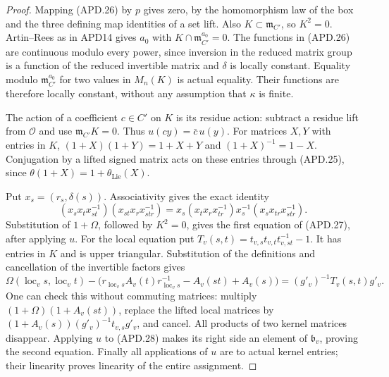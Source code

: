 \documentclass[11pt,a4paper]{article}
\numberwithin{equation}{section}
\theoremstyle{remark}\newtheorem{remark}[theorem]{Remark}
\begin{document}
\begin{proof}
Mapping (APD.26) by \(p\) gives zero, by the homomorphism law
of the box and the three defining map identities of a set lift.
Also \(K\subset\mathfrak m_{C'}\), so \(K^2=0\).
Artin--Rees as in APD14 gives \(a_0\) with
\(K\cap\mathfrak m_{C'}^{a_0}=0\).  The functions in (APD.26)
are continuous modulo every power, since inversion in the reduced
matrix group is a function of the reduced invertible matrix and
\(\delta\) is locally constant.  Equality modulo
\(\mathfrak m_{C'}^{a_0}\) for two values in \(M_n(K)\)
is actual equality.  Their functions are therefore locally
constant, without any assumption that \(\kappa\) is finite.

The action of a coefficient \(c\in C'\) on \(K\) is its
residue action: subtract a residue lift from \(\mathcal O\)
and use \(\mathfrak m_{C'}K=0\).  Thus \(u(cy)=\bar c\,u(y)\).
For matrices \(X,Y\) with entries in \(K\),
\((1+X)(1+Y)=1+X+Y\) and \((1+X)^{-1}=1-X\).
Conjugation by a lifted signed matrix acts on these entries
through (APD.25), since
\(\theta(1+X)=1+\theta_{\mathrm{Lie}}(X)\).

Put \(x_s=(r_s,\delta(s))\).  Associativity gives the exact
identity
\[
 (x_sx_tx_{st}^{-1})(x_{st}x_rx_{str}^{-1})
 =x_s(x_tx_rx_{tr}^{-1})x_s^{-1}(x_sx_{tr}x_{str}^{-1}).
\]
Substitution of \(1+\Omega\), followed by \(K^2=0\), gives
the first equation of (APD.27), after applying \(u\).
For the local equation put
\(T_v(s,t)=t_{v,s}t_{v,t}t_{v,st}^{-1}-1\).
It has entries in \(K\) and is upper triangular.  Substitution
of the definitions and cancellation of the invertible factors gives
\[
 \Omega(\operatorname{loc}_v s,\operatorname{loc}_v t)
 -\bigl(r_{\operatorname{loc}_v s}A_v(t)
             r_{\operatorname{loc}_v s}^{-1}
                 -A_v(st)+A_v(s)\bigr)
                 =(g'_v)^{-1}T_v(s,t)g'_v.                \tag{APD.28}
\]
One can check this without commuting matrices: multiply
\((1+\Omega)(1+A_v(st))\), replace the lifted local matrices
by \((1+A_v(s))(g'_v)^{-1}t_{v,s}g'_v\), and cancel.
All products of two kernel matrices disappear.  Applying \(u\)
to (APD.28) makes its right side an element of
\(\mathfrak b_v\), proving the second equation.  Finally all
applications of \(u\) are to actual kernel entries; their
linearity proves linearity of the entire assignment.
\end{proof}

\end{document}
